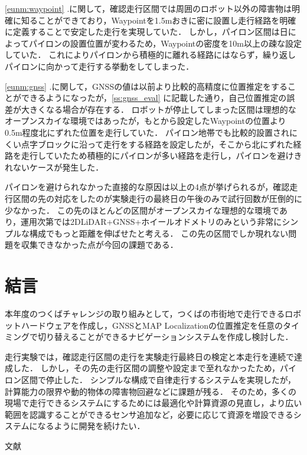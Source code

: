 \documentclass[platex,dvipdfmx]{rbproceedings}
\newcommand{\pkg}[1]{\textsf{#1}}
\begin{document}
\ref{eunm:waypoint} .に関して，確認走行区間では周囲のロボット以外の障害物は明確に知ることができており，Waypointを1.5mおきに密に設置し走行経路を明確に定義することで安定した走行を実現していた．
しかし，パイロン区間は日によってパイロンの設置位置が変わるため，Waypointの密度を10m以上の疎な設定していた．
これによりパイロンから積極的に離れる経路にはならず，繰り返しパイロンに向かって走行する挙動をしてしまった．

\ref{eunm:gnss} .に関して，GNSSの値は以前より比較的高精度に位置推定をすることができるようになったが，\ref{ss:gnss_eval} に記載した通り，自己位置推定の誤差が大きくなる場合が存在する．
ロボットが停止してしまった区間は理想的なオープンスカイな環境ではあったが，もとから設定したWaypointの位置より0.5m程度北にずれた位置を走行していた．
パイロン地帯でも比較的設置されにくい点字ブロックに沿って走行をする経路を設定したが，そこから北にずれた経路を走行していたため積極的にパイロンが多い経路を走行し，パイロンを避けきれないケースが発生した．

パイロンを避けられなかった直接的な原因は以上の4点が挙げられるが，確認走行区間の先の対応をしたのが実験走行の最終日の午後のみで試行回数が圧倒的に少なかった．
この先のほとんどの区間がオープンスカイな理想的な環境であり，運用次第では2DLiDAR+GNSS+ホイールオドメトリのみという非常にシンプルな構成でもっと距離を伸ばせたと考える．
この先の区間でしか現れない問題を収集できなかった点が今回の課題である．

\section{結言}
本年度のつくばチャレンジの取り組みとして，つくばの市街地で走行できるロボットハードウェアを作成し，GNSSとMAP Localizationの位置推定を任意のタイミングで切り替えることができるナビゲーションシステムを作成し検討した．

走行実験では，確認走行区間の走行を実験走行最終日の検定と本走行を連続で達成した．
しかし，その先の走行区間の調整や設定まで至れなかったため，パイロン区間で停止した．
シンプルな構成で自律走行するシステムを実現したが，計算能力の限界や動的物体の障害物回避などに課題が残る．
そのため，多くの現場で走行できるシステムにするためには最適化や計算資源の見直し，より広い範囲を認識することができるセンサ追加など，必要に応じて資源を増設できるシステムになるように開発を続けたい．

文献



\end{document}
